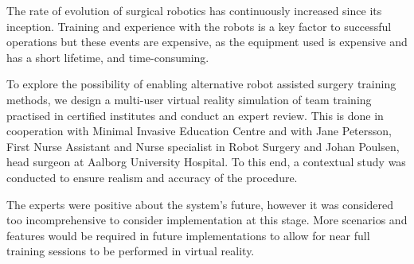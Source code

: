 The rate of evolution of surgical robotics has continuously increased since its inception. Training and experience with the robots is a key factor to successful operations but these events are expensive, as the equipment used is expensive and has a short lifetime, and time-consuming.

To explore the possibility of enabling alternative robot assisted surgery training methods, we design a multi-user virtual reality simulation of team training practised in certified institutes and conduct an expert review. This is done in cooperation with Minimal Invasive Education Centre and with Jane Petersson, First Nurse Assistant and Nurse specialist in Robot Surgery and Johan Poulsen, head surgeon at Aalborg University Hospital. To this end, a contextual study was conducted to ensure realism and accuracy of the procedure.

The experts were positive about the system's future, however it was considered too incomprehensive to consider implementation at this stage. More scenarios and features would be required in future implementations to allow for near full training sessions to be performed in virtual reality.